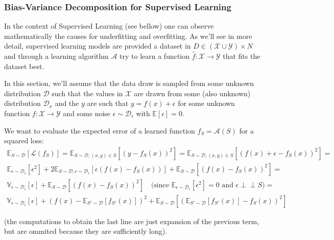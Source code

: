 \documentclass{article}
\newcommand{\E}{\mathbb{E}}
\newcommand{\var}{\mathbb{V}}
\newcommand{\indep}{\perp \!\!\! \perp}
\newcommand{\loss}{\mathcal{L}}
\newcommand{\dist}{\mathcal{D}}
\begin{document}
\subsubsection{Bias-Variance Decomposition for Supervised Learning}

In the context of Supervised Learning (see bellow) one can observe mathematically the causes for underfitting and overfitting.
As we'll see in more detail, supervised learning models are provided a dataset in $D \in (\mathcal{X} \cup \mathcal{Y}) \times N$ and through a learning algorithm $\mathcal{A}$ try to learn a function $\hat{f} : \mathcal{X} \to \mathcal{Y}$ that fits the dataset best.

In this section, we'll assume that the data draw is sampled from some unknown distribution $\dist$ such that the values in $\mathcal{X}$ are drawn from some (also unknown) distribution $\dist_x$ and the $y$ are such that $y = f(x) + \epsilon$ for some unknown function $f: \mathcal{X} \to \mathcal{Y}$ and some noise $\epsilon \sim \dist_\epsilon$ with $\E[\epsilon] = 0$.

We want to evaluate the expected error of a learned function $f_S = \mathcal{A}(S)$ for a squared loss:
\begin{gather*}
\E_{S \sim \dist} \left[ \loss(f_S) \right] = 
\E_{S \sim \dist, (x,y) \in S} \left[ (y - f_S(x))^2 \right] =
\E_{S \sim \dist, (x,y) \in S} \left[ (f(x) + \epsilon - f_S(x))^2 \right] = \\
\E_{\epsilon \sim \dist_\epsilon} [ \epsilon^2 ] + 
    2 \E_{S \sim \dist, \epsilon \sim \dist_\epsilon} \left[ \epsilon (f(x) - f_S(x)) \right] +
    \E_{S \sim \dist} \left[ (f(x) - f_S(x))^2 \right] = \\
\var_{\epsilon \sim \dist_\epsilon} [ \epsilon ] +
    \E_{S \sim \dist} \left[ (f(x) - f_S(x))^2 \right] \quad
	\text{(since } \E_{\epsilon \sim \dist_\epsilon} [ \epsilon^2 ] = 0 \text{ and } \epsilon \indep S \text{)} = \\
\var_{\epsilon \sim \dist_\epsilon} [ \epsilon ] +
    (f(x) - \E_{S' \sim \dist}[f_{S'}(x)])^2 +
    \E_{S \sim \dist} \left[ (\E_{S' \sim \dist} [ f_{S'}(x) ] - f_S(x))^2 \right]
\end{gather*}

(the computations to obtain the last line are just expansion of the previous term, but are ommited because they are sufficiently long).
\end{document}
